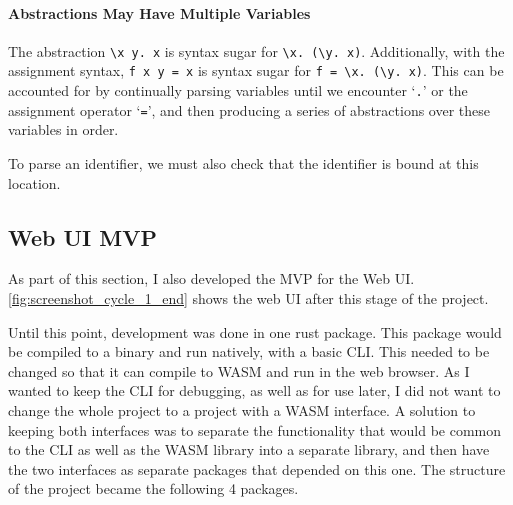 \paragraph{Abstractions May Have Multiple Variables}
The abstraction \verb|\x y. x| is syntax sugar for \newline\noindent\verb|\x. (\y. x)|. Additionally, with the assignment syntax, \verb|f x y = x| is syntax sugar for \newline\noindent\verb|f = \x. (\y. x)|. This can be accounted for by continually parsing variables until we encounter `\verb|.|' or the assignment operator `\verb|=|', and then producing a series of abstractions over these variables in order. 

To parse an identifier, we must also check that the identifier is bound at this location.

\subsection{Web UI \ac{MVP}}
As part of this section, I also developed the MVP for the Web UI. \ref{fig:screenshot_cycle_1_end} shows the web UI after this stage of the project. 

Until this point, development was done in one rust package. This package would be compiled to a binary and run natively, with a basic \ac{CLI}. This needed to be changed so that it can compile to \ac{WASM} and run in the web browser. As I wanted to keep the \ac{CLI} for debugging, as well as for use later, I did not want to change the whole project to a project with a \ac{WASM} interface. A solution to keeping both interfaces was to separate the functionality that would be common to the \ac{CLI} as well as the \ac{WASM} library into a separate library, and then have the two interfaces as separate packages that depended on this one. The structure of the project became the following 4 packages. 

